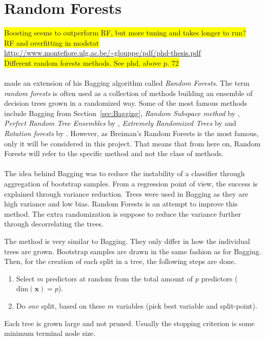 \section{Random Forests}
\label{sec:Random Forests}
\colorbox{yellow}{Boosting seems to outperform RF, but more tuning and takes longer to run?} \\
\colorbox{yellow}{RF and overfitting in modstat}\\
\url{http://www.montefiore.ulg.ac.be/~glouppe/pdf/phd-thesis.pdf} \\
\colorbox{yellow}{Different random forests methods. See phd. above p. 72} \\
\\
\cite{randomforests} made an extension of his Bagging algorithm called \textit{Random Forests}. The term \textit{random forests} is often used as a collection of methods building an ensemble of decision trees grown in a randomized way. 
Some of the most famous methods include Bagging from Section~\ref{sec:Bagging}, \textit{Random Subspace method} by \cite{ho1998random}, \textit{Perfect Random Tree Ensembles} by \cite{cutler2001pert}, \textit{Extremely Randomized Trees} by \cite{Geurts2006} and \textit{Rotation forests} by \cite{Rodriguez2006}. 
However, as Breiman's Random Forests is the most famous, only it will be considered in this project. That means that from here on, Random Forests will refer to the specific method and not the class of methods.
\\
\\
The idea behind Bagging was to reduce the instability of a classifier through aggregation of bootstrap samples. From a regression point of view, the success is explained through variance reduction. Trees were used in Bagging as they are  high variance and low bias. Random Forests is an attempt to improve this method. The extra randomization is suppose to reduce the variance further through decorrelating the trees. 

The method is very similar to Bagging. They only differ in how the individual trees are grown. Bootstrap samples are drawn in the same fashion as for Bagging. Then, for the creation of each split in a tree, the following steps are done. 
\begin{enumerate}
  \item Select $m$ predictors at random from the total amount of $p$ predictors ($\mathrm{dim}(\mathbf{x}) = p$).
  \item Do \textit{one} split, based on these $m$ variables (pick best variable and split-point). 
\end{enumerate}
Each tree is grown large and not pruned. Usually the stopping criterion is some minimum terminal node size.

